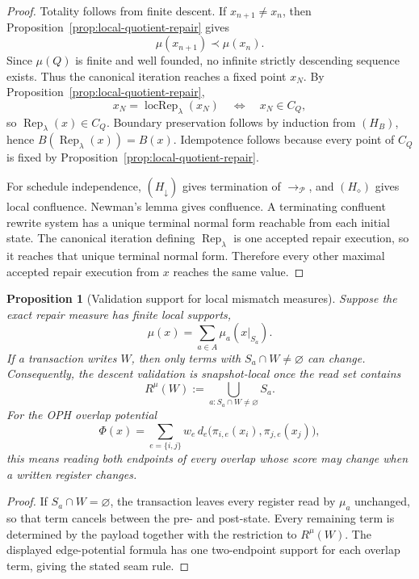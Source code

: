 \documentclass[11pt]{article}
\newtheorem{proposition}[theorem]{Proposition}
\theoremstyle{remark}
\theoremstyle{plain}
\begin{document}
\begin{proof}
Totality follows from finite descent.  If \(x_{n+1}\ne x_n\), then
Proposition~\ref{prop:local-quotient-repair} gives
\[
\mu(x_{n+1})\prec\mu(x_n).
\]
Since \(\mu(Q)\) is finite and well founded, no infinite strictly descending sequence exists.
Thus the canonical iteration reaches a fixed point \(x_N\).  By
Proposition~\ref{prop:local-quotient-repair},
\[
x_N=\operatorname{locRep}_\lambda(x_N)
\quad\Longleftrightarrow\quad
x_N\in C_Q,
\]
so \(\operatorname{Rep}_\lambda(x)\in C_Q\).  Boundary preservation follows by induction from
\((H_B)\), hence \(B(\operatorname{Rep}_\lambda(x))=B(x)\).  Idempotence follows because every
point of \(C_Q\) is fixed by Proposition~\ref{prop:local-quotient-repair}.

For schedule independence, \((H_\downarrow)\) gives termination of \(\to_{\mathcal P}\), and
\((H_\diamond)\) gives local confluence.  Newman's lemma gives confluence.  A terminating
confluent rewrite system has a unique terminal normal form reachable from each initial state.  The
canonical iteration defining \(\operatorname{Rep}_\lambda\) is one accepted repair execution, so it
reaches that unique terminal normal form.  Therefore every other maximal accepted repair execution
from \(x\) reaches the same value.
\end{proof}

\begin{proposition}[Validation support for local mismatch measures]\label{prop:validation-support}
Suppose the exact repair measure has finite local supports,
\[
\mu(x)=\sum_{a\in A}\mu_a(x|_{S_a}).
\]
If a transaction writes \(W\), then only terms with \(S_a\cap W\ne\varnothing\) can change.
Consequently, the descent validation is snapshot-local once the read set contains
\[
R^\mu(W):=\bigcup_{a:S_a\cap W\ne\varnothing}S_a .
\]
For the OPH overlap potential
\[
\Phi(x)=\sum_{e=\{i,j\}}w_e\,d_e\!\bigl(\pi_{i,e}(x_i),\pi_{j,e}(x_j)\bigr),
\]
this means reading both endpoints of every overlap whose score may change when a written register
changes.
\end{proposition}

\begin{proof}
If \(S_a\cap W=\varnothing\), the transaction leaves every register read by \(\mu_a\) unchanged,
so that term cancels between the pre- and post-state. Every remaining term is determined by the
payload together with the restriction to \(R^\mu(W)\). The displayed edge-potential formula has
one two-endpoint support for each overlap term, giving the stated seam rule.
\end{proof}
\end{document}
